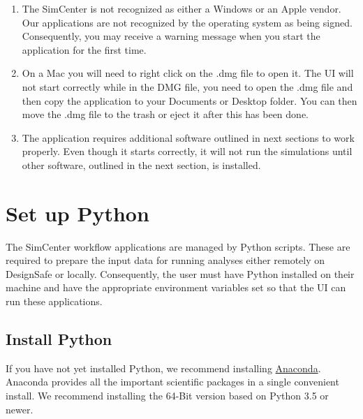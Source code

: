 

\begin{enumerate}
\item The SimCenter is not recognized as either a Windows or an Apple vendor. Our applications are not recognized by the operating system as being signed. Consequently, you may receive a warning message when you start the \texttt{\getsoftwarename{}} application for the first time.
\item  On a Mac you will need to right click on the .dmg file to open it. The UI will not start correctly while in the DMG file, you need to open the .dmg file and then copy the \texttt{\getsoftwarename{}} application to your Documents or Desktop folder. You can then move the .dmg file to the trash or eject it after this has been done.
\item  The \texttt{\getsoftwarename{}} application requires additional software outlined in next sections to work properly. Even though it starts correctly, it will not run the simulations until other software, outlined in the next section, is installed.
\end{enumerate}


\section{Set up Python}

The SimCenter workflow applications are managed by Python
scripts. These are required to prepare the input data for running
analyses either remotely on DesignSafe or locally. Consequently, the user must have Python
installed on their machine and have the appropriate environment
variables set so that the UI can run these applications.

\subsection{Install Python}

If you have not yet installed Python, we recommend
installing \href{http://www.anaconda.com/distribution/#download-section}{Anaconda}. Anaconda
provides all the important scientific packages in a single convenient
install. We recommend installing the 64-Bit version based on Python
3.5 or newer.

